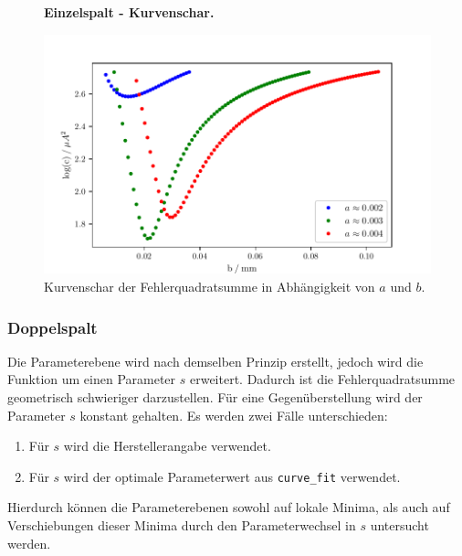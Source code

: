 \begin{figure}
    \centering
    \textbf{Einzelspalt - Kurvenschar.}\par\medskip
    \includegraphics[width=.9\textwidth]{python/2DPlot.pdf}
    \caption{Kurvenschar der Fehlerquadratsumme in Abhängigkeit von $a$ und $b$.}
    \label{fig:2d}
\end{figure}

\subsubsection{Doppelspalt}
Die Parameterebene wird nach demselben Prinzip erstellt, jedoch wird die Funktion um einen Parameter $s$ erweitert. Dadurch ist die
Fehlerquadratsumme geometrisch schwieriger darzustellen.
Für eine Gegenüberstellung wird der Parameter $s$ konstant gehalten. Es werden zwei Fälle unterschieden:\\
\begin{enumerate}
    \item Für $s$ wird die Herstellerangabe verwendet.
    \item Für $s$ wird der optimale Parameterwert aus \texttt{curve\_fit} verwendet.
\end{enumerate}
Hierdurch können die Parameterebenen sowohl auf lokale Minima, als auch auf Verschiebungen dieser Minima durch den Parameterwechsel in $s$
untersucht werden.

